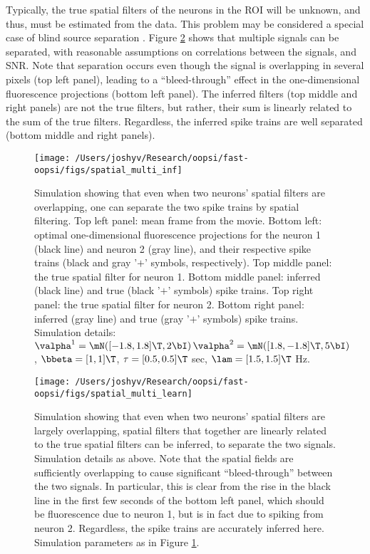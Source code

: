 Typically, the true spatial filters of the neurons in the ROI will be unknown, and thus, must be estimated from the data.  This problem may be considered a special case of blind source separation \cite{BellSejnowski95, MukamelSchnitzer09}. Figure \ref{fig:spatial_multi_learn} shows that multiple signals can be separated, with reasonable assumptions on correlations between the signals, and SNR.  Note that separation occurs even though the signal is overlapping in several pixels (top left panel), leading to a ``bleed-through'' effect in the one-dimensional fluorescence projections (bottom left panel). The inferred filters (top middle and right panels) are not the true filters, but rather, their sum is linearly related to the sum of the true filters.  Regardless, the inferred spike trains are well separated (bottom middle and right panels).




\begin{figure}[h!]
\centering \texttt{[image: /Users/joshyv/Research/oopsi/fast-oopsi/figs/spatial\_multi\_inf]}
\caption[overlapping spatial filters are not problematic]{Simulation showing that even when two neurons' spatial filters are overlapping, one can separate the two spike trains by spatial filtering. Top left panel: mean frame from the movie.  Bottom left: optimal one-dimensional fluorescence projections for the neuron 1 (black line) and neuron 2 (gray line), and their respective spike trains (black and gray '$+$' symbols, respectively).  Top middle panel: the true spatial filter for neuron 1.  Bottom middle panel: inferred (black line) and true (black '$+$' symbols) spike trains.  Top right panel: the true spatial filter for neuron 2.   Bottom right panel: inferred (gray line) and true (gray '$+$' symbols) spike trains. Simulation details: $\valpha^1=\mN([-1.8, 1.8]\T,2 \bI)\, \valpha^2=\mN([1.8, -1.8]\T,5 \bI)$, $\bbeta=[1, 1]\T$, $\tau=[0.5, 0.5]\T$ sec, $\lam=[1.5, 1.5]\T$ Hz.} \label{fig:spatial_multi_inf}
\end{figure}



\begin{figure}[h!]
\centering \texttt{[image: /Users/joshyv/Research/oopsi/fast-oopsi/figs/spatial\_multi\_learn]}
\caption[overlapping spatial filters can be estimated]{Simulation showing that even when two neurons' spatial filters are largely overlapping, spatial filters that together are linearly related to the true spatial filters can be inferred, to separate the two signals. Simulation details as above. Note that the spatial fields are sufficiently overlapping to cause significant ``bleed-through'' between the two signals.  In particular, this is clear from the rise in the black line in the first few seconds of the bottom left panel, which should be fluorescence due to neuron 1, but is in fact due to spiking from neuron 2. Regardless, the spike trains are accurately inferred here.  Simulation parameters as in Figure \ref{fig:spatial_multi_inf}.} \label{fig:spatial_multi_learn}
\end{figure}





